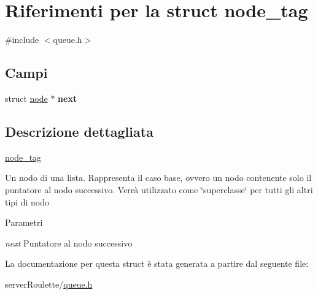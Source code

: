 \hypertarget{structnode__tag}{
\section{Riferimenti per la struct node\_\-tag}
\label{structnode__tag}
}


{\ttfamily \#include $<$queue.h$>$}

\subsection*{Campi}
\begin{DoxyCompactItemize}
\item 
\hypertarget{structnode__tag_a4b52e1dbc2c0d0c0d9c5fe3bb255c668}{
struct \hyperlink{structnode__tag}{node} $\ast$ {\bfseries next}}
\label{structnode__tag_a4b52e1dbc2c0d0c0d9c5fe3bb255c668}

\end{DoxyCompactItemize}


\subsection{Descrizione dettagliata}
\hyperlink{structnode__tag}{node\_\-tag}

Un nodo di una lista. Rappresenta il caso base, ovvero un nodo contenente solo il puntatore al nodo successivo. Verrà utilizzato come \char`\"{}superclasse\char`\"{} per tutti gli altri tipi di nodo


\begin{DoxyParams}{Parametri}
\item[{\em next}]Puntatore al nodo successivo \end{DoxyParams}


La documentazione per questa struct è stata generata a partire dal seguente file:\begin{DoxyCompactItemize}
\item 
serverRoulette/\hyperlink{queue_8h}{queue.h}\end{DoxyCompactItemize}
